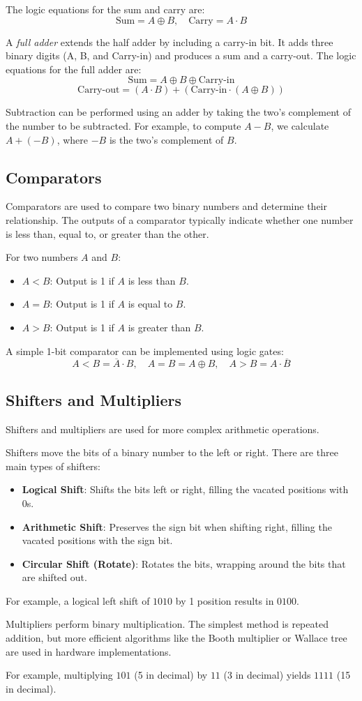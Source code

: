 The logic equations for the sum and carry are:
\[
    \text{Sum} = A \oplus B, \quad \text{Carry} = A \cdot B
\]

A \emph{full adder} extends the half adder by including a carry-in bit.
It adds three binary digits (A, B, and Carry-in) and produces a sum and
a carry-out. The logic equations for the full adder are:
\[
    \text{Sum} = A \oplus B \oplus \text{Carry-in}
\]
\[
    \text{Carry-out} = (A \cdot B) + (\text{Carry-in} \cdot (A \oplus B))
\]

Subtraction can be performed using an adder by taking the two's
complement of the number to be subtracted. For example, to compute
$A - B$, we calculate $A + (-B)$, where $-B$ is the two's complement
of $B$.

\subsection{Comparators}
Comparators are used to compare two binary numbers and determine
their relationship. The outputs of a comparator typically indicate
whether one number is less than, equal to, or greater than the other.

For two numbers $A$ and $B$:
\begin{itemize}
    \item $A < B$: Output is 1 if $A$ is less than $B$.
    \item $A = B$: Output is 1 if $A$ is equal to $B$.
    \item $A > B$: Output is 1 if $A$ is greater than $B$.
\end{itemize}

A simple 1-bit comparator can be implemented using logic gates:
\[
    A < B = \overline{A} \cdot B, \quad A = B = A \oplus B, \quad A > B = A \cdot \overline{B}
\]

\subsection{Shifters and Multipliers}
Shifters and multipliers are used for more complex arithmetic operations.

Shifters move the bits of a binary number to the left or right.
There are three main types of shifters:
\begin{itemize}
    \item \textbf{Logical Shift}: Shifts the bits left or right,
          filling the vacated positions with 0s.
    \item \textbf{Arithmetic Shift}: Preserves the sign bit when
          shifting right, filling the vacated positions with the sign bit.
    \item \textbf{Circular Shift (Rotate)}: Rotates the bits,
          wrapping around the bits that are shifted out.
\end{itemize}

For example, a logical left shift of $1010$ by 1 position results
in $0100$.

Multipliers perform binary multiplication. The simplest method is
repeated addition, but more efficient algorithms like the Booth
multiplier or Wallace tree are used in hardware implementations.

For example, multiplying $101$ (5 in decimal) by $11$ (3 in decimal)
yields $1111$ (15 in decimal).